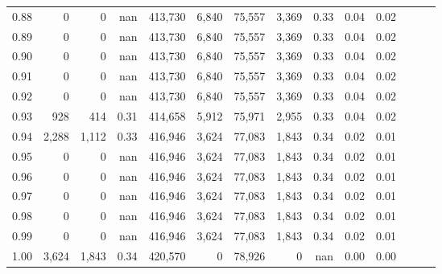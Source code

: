 \begin{tabular}{rrrrrrrrrrrrrr}
0.88 &       0 &      0 &   nan &  413,730 &    6,840 &  75,557 &   3,369 &  0.33 &  0.04 &      0.02 \\
0.89 &       0 &      0 &   nan &  413,730 &    6,840 &  75,557 &   3,369 &  0.33 &  0.04 &      0.02 \\
0.90 &       0 &      0 &   nan &  413,730 &    6,840 &  75,557 &   3,369 &  0.33 &  0.04 &      0.02 \\
0.91 &       0 &      0 &   nan &  413,730 &    6,840 &  75,557 &   3,369 &  0.33 &  0.04 &      0.02 \\
0.92 &       0 &      0 &   nan &  413,730 &    6,840 &  75,557 &   3,369 &  0.33 &  0.04 &      0.02 \\
0.93 &     928 &    414 &  0.31 &  414,658 &    5,912 &  75,971 &   2,955 &  0.33 &  0.04 &      0.02 \\
0.94 &   2,288 &  1,112 &  0.33 &  416,946 &    3,624 &  77,083 &   1,843 &  0.34 &  0.02 &      0.01 \\
0.95 &       0 &      0 &   nan &  416,946 &    3,624 &  77,083 &   1,843 &  0.34 &  0.02 &      0.01 \\
0.96 &       0 &      0 &   nan &  416,946 &    3,624 &  77,083 &   1,843 &  0.34 &  0.02 &      0.01 \\
0.97 &       0 &      0 &   nan &  416,946 &    3,624 &  77,083 &   1,843 &  0.34 &  0.02 &      0.01 \\
0.98 &       0 &      0 &   nan &  416,946 &    3,624 &  77,083 &   1,843 &  0.34 &  0.02 &      0.01 \\
0.99 &       0 &      0 &   nan &  416,946 &    3,624 &  77,083 &   1,843 &  0.34 &  0.02 &      0.01 \\
1.00 &   3,624 &  1,843 &  0.34 &  420,570 &        0 &  78,926 &       0 &   nan &  0.00 &      0.00 \\
\bottomrule
\end{tabular}
